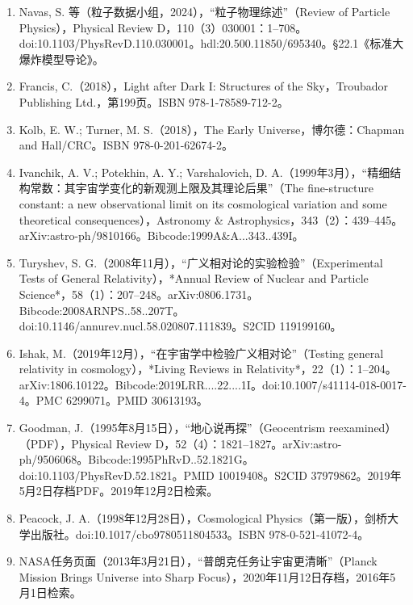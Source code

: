 \begin{enumerate}
\item Navas, S. 等（粒子数据小组，2024），“粒子物理综述”（Review of Particle Physics），Physical Review D，110（3）030001：1–708。doi:10.1103/PhysRevD.110.030001。hdl:20.500.11850/695340。§22.1《标准大爆炸模型导论》。  
\item Francis, C.（2018），Light after Dark I: Structures of the Sky，Troubador Publishing Ltd.，第199页。ISBN 978-1-78589-712-2。  
\item Kolb, E. W.; Turner, M. S.（2018），The Early Universe，博尔德：Chapman and Hall/CRC。ISBN 978-0-201-62674-2。  
\item Ivanchik, A. V.; Potekhin, A. Y.; Varshalovich, D. A.（1999年3月），“精细结构常数：其宇宙学变化的新观测上限及其理论后果”（The fine-structure constant: a new observational limit on its cosmological variation and some theoretical consequences），Astronomy & Astrophysics，343（2）：439–445。arXiv:astro-ph/9810166。Bibcode:1999A&A...343..439I。  
\item Turyshev, S. G.（2008年11月），“广义相对论的实验检验”（Experimental Tests of General Relativity），*Annual Review of Nuclear and Particle Science*，58（1）：207–248。arXiv:0806.1731。Bibcode:2008ARNPS..58..207T。doi:10.1146/annurev.nucl.58.020807.111839。S2CID 119199160。  
\item Ishak, M.（2019年12月），“在宇宙学中检验广义相对论”（Testing general relativity in cosmology），*Living Reviews in Relativity*，22（1）：1–204。arXiv:1806.10122。Bibcode:2019LRR....22....1I。doi:10.1007/s41114-018-0017-4。PMC 6299071。PMID 30613193。  
\item Goodman, J.（1995年8月15日），“地心说再探”（Geocentrism reexamined）（PDF），Physical Review D，52（4）：1821–1827。arXiv:astro-ph/9506068。Bibcode:1995PhRvD..52.1821G。doi:10.1103/PhysRevD.52.1821。PMID 10019408。S2CID 37979862。2019年5月2日存档PDF。2019年12月2日检索。  
\item Peacock, J. A.（1998年12月28日），Cosmological Physics（第一版），剑桥大学出版社。doi:10.1017/cbo9780511804533。ISBN 978-0-521-41072-4。  
\item NASA任务页面（2013年3月21日），“普朗克任务让宇宙更清晰”（Planck Mission Brings Universe into Sharp Focus），2020年11月12日存档，2016年5月1日检索。
\end{enumerate}






